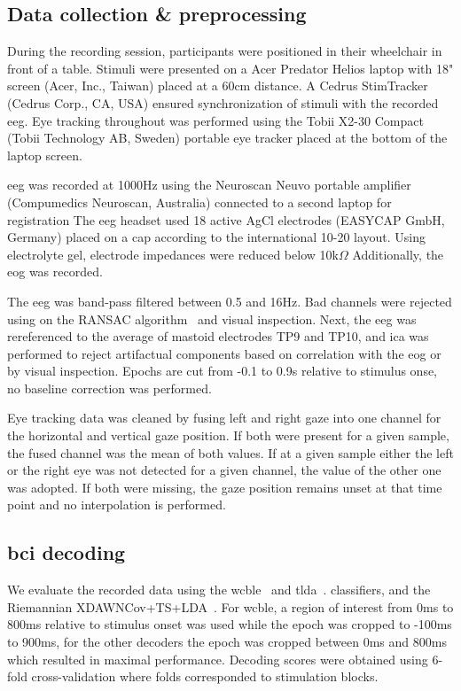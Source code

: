 \subsection{Data collection \& preprocessing}

During the recording session, participants were positioned in their wheelchair in front of a table.
Stimuli were presented on a Acer Predator Helios laptop with 18" screen (Acer,
Inc., Taiwan) placed at a 60cm distance.
A Cedrus StimTracker (Cedrus Corp., CA, USA) ensured synchronization of stimuli with the
recorded \ac{eeg}.
Eye tracking throughout was performed using the Tobii X2-30 Compact (Tobii
Technology AB, Sweden) portable eye tracker placed at the bottom of the laptop screen.

\Ac{eeg} was recorded at 1000Hz using the Neuroscan Neuvo  portable amplifier (Compumedics Neuroscan,
Australia) connected to a second laptop for registration
The \ac{eeg} headset used 18 active AgCl electrodes (EASYCAP GmbH, Germany) placed on a cap
according to the international 10-20 layout.
Using electrolyte gel, electrode impedances were reduced below 10k$\Omega$
Additionally, the \ac{eog} was recorded.

The \ac{eeg} was band-pass filtered between 0.5 and 16Hz.
Bad channels were rejected using on the RANSAC algorithm~\cite{Fischler1981}
and visual inspection.
Next, the \ac{eeg} was rereferenced to the average of mastoid electrodes TP9
and TP10, and \ac{ica} was performed to reject artifactual components based on
correlation with the \ac{eog} or by visual inspection.
Epochs are cut from -0.1 to 0.9s relative to stimulus onse, no baseline
correction was performed.

Eye tracking data was cleaned by fusing left and right gaze into one channel
for the horizontal and vertical gaze position.
If both were present for a given sample, the fused channel was the mean of both
values.
If at a given sample either the left or the right eye was not detected for a
given channel, the value of the other one was adopted.
If both were missing, the gaze position remains unset at that time point and no
interpolation is performed.

\subsection{\Acs{bci} decoding}

We evaluate the recorded data using the \ac{wcble}~\cite{VanDenKerchove2024}
and \ac{tlda}~\cite{Sosulski2022}.
classifiers, and the Riemannian XDAWNCov+TS+LDA~\cite{Cecotti2017}.
For \ac{wcble}, a region of interest from 0ms to 800ms relative to stimulus
onset was used while the epoch was cropped to -100ms to 900ms, for the other
decoders the epoch was cropped between 0ms and 800ms which resulted in maximal
performance.
Decoding scores were obtained using 6-fold cross-validation where folds corresponded to
stimulation blocks.


